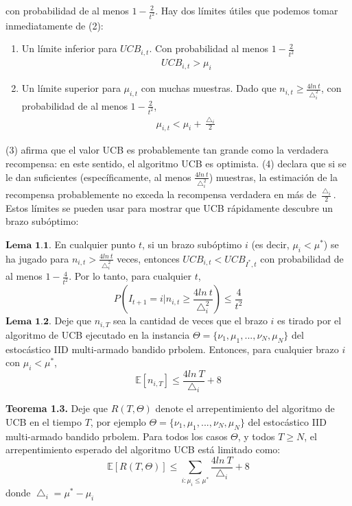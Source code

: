 \documentclass{article}
\begin{document}
con probabilidad de al menos $1 - \frac{2}{t^2}$. Hay dos límites útiles que podemos tomar inmediatamente de (2):
\begin{enumerate}
    \item Un límite inferior para $UCB_{i,t}$. Con probabilidad al menos $1 - \frac{2}{t^2}$
    \begin{gather}
        UCB_{i,t} > \mu_{i}
    \end{gather}
    \item Un límite superior para $\mu_{i,t}$ con muchas muestras. Dado que $n_{i,t} \geq \frac{4ln \>t}{\bigtriangleup^2_{i}} $, con probabilidad de al menos $1 - \frac{2}{t^2}$,
    \begin{gather}
        \mu_{i,t} < \mu_{i} + \frac{\bigtriangleup_i }{2}
    \end{gather}
\end{enumerate}
(3) afirma que el valor UCB es probablemente tan grande como la verdadera recompensa: en este sentido, el algoritmo UCB es optimista. (4) declara que si se le dan suficientes (específicamente, al menos $\frac{4ln \>t}{\bigtriangleup^2_{i}}$) muestras, la estimación de la recompensa probablemente no exceda la recompensa verdadera en más de $\frac{\bigtriangleup_i }{2}$. Estos límites se pueden usar para mostrar que UCB rápidamente descubre un brazo subóptimo:

$\textbf{Lema 1.1.}$ En cualquier punto $t$, si un brazo subóptimo $i$ (es decir, $\mu_i < \mu^*$) se ha jugado para $n_{i,t}> \frac{4 ln \> t}{\bigtriangleup ^2_i}$ veces, entonces $UCB_{i, t} <UCB_{I^*, t}$ con probabilidad de al menos $1 - \frac{4}{t^2}$. Por lo tanto, para cualquier $t$,
\[P\left(
I_{t+1}= i | n_{i,t}  \geq \frac{4 ln \> t}{\bigtriangleup^2_i} \right) \leq \frac{4}{t^2}
\]
$\textbf{Lema 1.2.}$ Deje que $n_{i, T}$ sea la cantidad de veces que el brazo $i$ es tirado por el algoritmo de UCB ejecutado en la instancia $\Theta= \{ \nu_1, \mu_1,. . . , \nu_N, \mu_N\}$ del estocástico IID multi-armado bandido prbolem. Entonces, para cualquier brazo $i$ con $\mu_i <\mu^*$,
\[
\mathds{E}[n_{i,T}]\leq \frac{4 ln\>T}{\bigtriangleup_i}+8
\]

\textbf{Teorema 1.3.} Deje que $R(T, \Theta)$ denote el arrepentimiento del algoritmo de UCB en el tiempo $T$, por ejemplo $\Theta= \{ \nu_1, \mu_1,. . . , \nu_N, \mu_N\}$
del estocástico IID multi-armado bandido prbolem. Para todos los casos $\Theta$, y todos $T \geq N$, el arrepentimiento esperado del algoritmo UCB está limitado como:
\[
\mathds{E}[R(T, \Theta)]\leq {\sum_{i:\mu_i \leq
\mu^*}} \frac{4 ln\>T}{\bigtriangleup_i}+8
\]
donde $\bigtriangleup_i = \mu^*-\mu_i$
\end{document}
